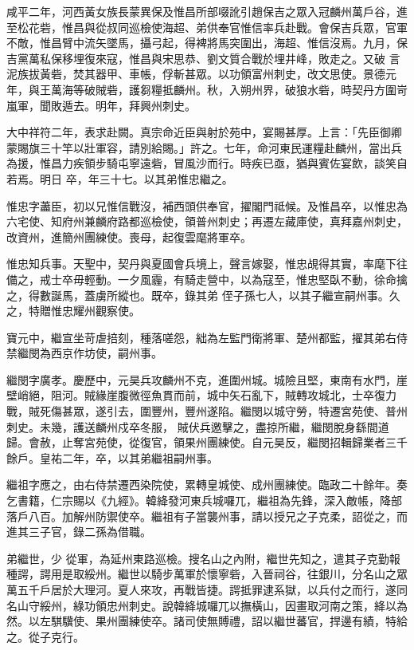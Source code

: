 \begin{pinyinscope}
 咸平二年，河西黃女族長蒙異保及惟昌所部啜訛引趙保吉之眾入冠麟州萬戶谷，進至松花砦，惟昌與從叔同巡檢使海超、弟供奉官惟信率兵赴戰。會保吉兵眾，官軍不敵，惟昌臂中流矢墜馬，攝弓起，得裨將馬突圍出，海超、惟信沒焉。九月，保吉黨萬私保移埋復來寇，惟昌與宋思恭、劉文質合戰於埋井峰，敗走之。又破
 言泥族拔黃砦，焚其器甲、車帳，俘斬甚眾。以功領富州刺史，改文思使。景德元年，與王萬海等破賊砦，護芻糧抵麟州。秋，入朔州界，破狼水砦，時契丹方圍岢嵐軍，聞敗遁去。明年，拜興州刺史。



 大中祥符二年，表求赴闕。真宗命近臣與射於苑中，宴賜甚厚。上言：「先臣御卿蒙賜旗三十竿以壯軍容，請別給賜。」許之。七年，命河東民運糧赴麟州，當出兵為援，惟昌力疾領步騎屯寧遠砦，冒風沙而行。時疾已亟，猶與賓佐宴飲，談笑自若焉。明日
 卒，年三十七。以其弟惟忠繼之。



 惟忠字藎臣，初以兄惟信戰沒，補西頭供奉官，擢閣門祗候。及惟昌卒，以惟忠為六宅使、知府州兼麟府路都巡檢使，領普州刺史；再遷左藏庫使，真拜嘉州刺史，改資州，進簡州團練使。喪母，起復雲麾將軍卒。



 惟忠知兵事。天聖中，契丹與夏國會兵境上，聲言嫁娶，惟忠覘得其實，率麾下往備之，戒士卒毋輕動。一夕風霾，有騎走營中，以為寇至，惟忠堅臥不動，徐命擒之，得數誕馬，蓋虜所縱也。既卒，錄其弟
 侄子孫七人，以其子繼宣嗣州事。久之，特贈惟忠耀州觀察使。



 寶元中，繼宣坐苛虐掊刻，種落嗟怨，絀為左監門衛將軍、楚州都監，擢其弟右侍禁繼閔為西京作坊使，嗣州事。



 繼閔字廣孝。慶歷中，元昊兵攻麟州不克，進圍州城。城險且堅，東南有水門，崖壁峭絕，阻河。賊緣崖腹微徑魚貫而前，城中矢石亂下，賊轉攻城北，士卒復力戰，賊死傷甚眾，遂引去，圍豐州，豐州遂陷。繼閔以城守勞，特遷宮苑使、普州刺史。未幾，護送麟州戍卒冬服，
 賊伏兵邀擊之，盡掠所繼，繼閔脫身繇間道歸。會赦，止奪宮苑使，從復官，領果州團練使。自元昊反，繼閔招輯歸業者三千餘戶。皇祐二年，卒，以其弟繼祖嗣州事。



 繼祖字應之，由右侍禁遷西染院使，累轉皇城使、成州團練使。臨政二十餘年。奏乞書籍，仁宗賜以《九經》。韓絳發河東兵城囉兀，繼祖為先鋒，深入敵帳，降部落戶八百。加解州防禦使卒。繼祖有子當襲州事，請以授兄之子克柔，詔從之，而進其三子官，錄二孫為借職。



 弟繼世，少
 從軍，為延州東路巡檢。搜名山之內附，繼世先知之，遣其子克勤報種諤，諤用是取綏州。繼世以騎步萬軍於懷寧砦，入晉祠谷，往銀川，分名山之眾萬五千戶居於大理河。夏人來攻，再戰皆捷。諤抵罪逮系獄，以兵付之而行，遂同名山守綏州，綠功領忠州刺史。說韓絳城囉兀以撫橫山，因畫取河南之策，絳以為然。以左騏驥使、果州團練使卒。諸司使無賻禮，詔以繼世蕃官，捍邊有績，特給之。從子克行。




\end{pinyinscope}
